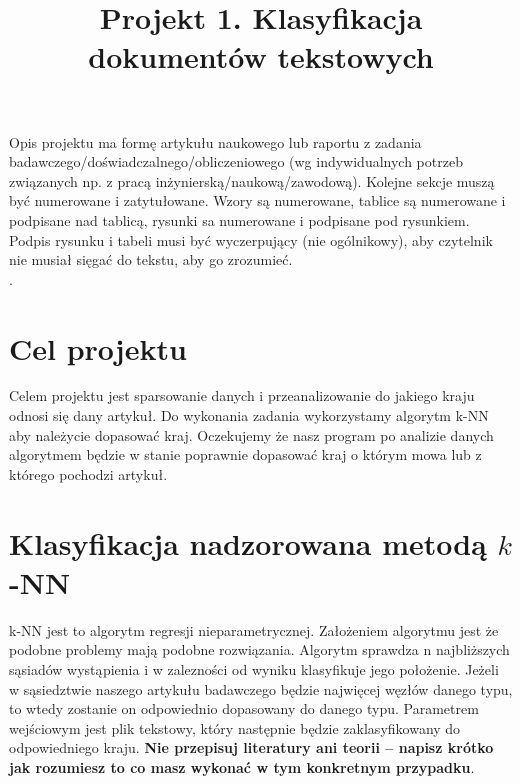 \documentclass{classrep}
\author{
  \studentinfo{Przemysław Lis}{229940} \and
  \studentinfo{Paweł Cichocki}{150848} }
\title{Projekt 1. Klasyfikacja dokumentów tekstowych}
\begin{document}
\maketitle

Opis projektu ma formę artykułu naukowego lub raportu z zadania
badawczego/doświadczalnego/obliczeniowego (wg indywidualnych potrzeb związanych np. z
pracą inżynierską/naukową/zawodową). Kolejne sekcje muszą być numerowane i
zatytułowane. Wzory są numerowane, tablice są numerowane i podpisane nad
tablicą, rysunki sa numerowane i podpisane pod rysunkiem. Podpis rysunku i
tabeli musi być wyczerpujący (nie ogólnikowy), aby czytelnik nie musiał sięgać do tekstu, aby go
zrozumieć.\\
. 

\section{Cel projektu}
Celem projektu jest sparsowanie danych i przeanalizowanie do jakiego kraju odnosi się 
dany artykuł. Do wykonania zadania wykorzystamy algorytm k-NN aby należycie dopasować
kraj. Oczekujemy że nasz program po analizie danych algorytmem będzie w stanie poprawnie
dopasować kraj o którym mowa lub z którego pochodzi artykuł.\\


\section{Klasyfikacja nadzorowana metodą $k$-NN}
k-NN jest to algorytm  regresji nieparametrycznej. Założeniem algorytmu jest że podobne problemy mają podobne rozwiązania. Algorytm sprawdza n najbliższych sąsiadów wystąpienia i w zalezności od wyniku klasyfikuje jego położenie. Jeżeli w sąsiedztwie naszego artykułu badawczego będzie najwięcej węzłów danego typu, to wtedy zostanie on odpowiednio dopasowany do danego typu.
Parametrem wejściowym jest plik tekstowy, który następnie będzie zaklasyfikowany do odpowiedniego kraju. {\bf Nie przepisuj literatury ani teorii -- napisz krótko jak
rozumiesz to co masz wykonać w tym konkretnym przypadku}.\\
\end{document}

